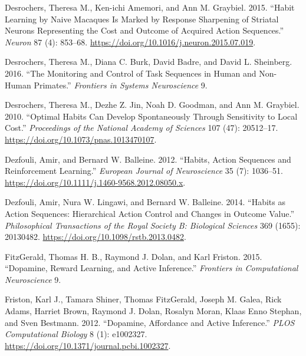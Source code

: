 \documentclass{article}
\newlength{\cslhangindent}
\newlength{\cslentryspacingunit} %
\newenvironment{CSLReferences}[2] %
 {%
  \setlength{\parindent}{0pt}
  \ifodd #1
  \let\oldpar\par
  \def\par{\hangindent=\cslhangindent\oldpar}
  \fi
  \setlength{\parskip}{#2\cslentryspacingunit}
 }%
 {}
\begin{document}
\begin{CSLReferences}{1}{0}
\leavevmode{}%
Desrochers, Theresa M., Ken-ichi Amemori, and Ann M. Graybiel. 2015.
{``Habit {Learning} by {Naive Macaques Is Marked} by {Response
Sharpening} of {Striatal Neurons Representing} the {Cost} and {Outcome}
of {Acquired Action Sequences}.''} \emph{Neuron} 87 (4): 853--68.
\url{https://doi.org/10.1016/j.neuron.2015.07.019}.

\leavevmode{}%
Desrochers, Theresa M., Diana C. Burk, David Badre, and David L.
Sheinberg. 2016. {``The {Monitoring} and {Control} of {Task Sequences}
in {Human} and {Non-Human Primates}.''} \emph{Frontiers in Systems
Neuroscience} 9.

\leavevmode{}%
Desrochers, Theresa M., Dezhe Z. Jin, Noah D. Goodman, and Ann M.
Graybiel. 2010. {``Optimal Habits Can Develop Spontaneously Through
Sensitivity to Local Cost.''} \emph{Proceedings of the National Academy
of Sciences} 107 (47): 20512--17.
\url{https://doi.org/10.1073/pnas.1013470107}.

\leavevmode{}%
Dezfouli, Amir, and Bernard W. Balleine. 2012. {``Habits, Action
Sequences and Reinforcement Learning.''} \emph{European Journal of
Neuroscience} 35 (7): 1036--51.
\url{https://doi.org/10.1111/j.1460-9568.2012.08050.x}.

\leavevmode{}%
Dezfouli, Amir, Nura W. Lingawi, and Bernard W. Balleine. 2014.
{``Habits as Action Sequences: Hierarchical Action Control and Changes
in Outcome Value.''} \emph{Philosophical Transactions of the Royal
Society B: Biological Sciences} 369 (1655): 20130482.
\url{https://doi.org/10.1098/rstb.2013.0482}.

\leavevmode{}%
FitzGerald, Thomas H. B., Raymond J. Dolan, and Karl Friston. 2015.
{``Dopamine, Reward Learning, and Active Inference.''} \emph{Frontiers
in Computational Neuroscience} 9.

\leavevmode{}%
Friston, Karl J., Tamara Shiner, Thomas FitzGerald, Joseph M. Galea,
Rick Adams, Harriet Brown, Raymond J. Dolan, Rosalyn Moran, Klaas Enno
Stephan, and Sven Bestmann. 2012. {``Dopamine, {Affordance} and {Active
Inference}.''} \emph{PLOS Computational Biology} 8 (1): e1002327.
\url{https://doi.org/10.1371/journal.pcbi.1002327}.


\end{CSLReferences}
\end{document}
